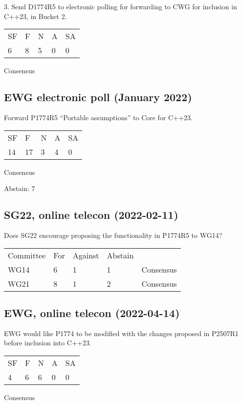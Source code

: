 3. Send D1774R5 to electronic polling for forwarding to CWG for inclusion in C++23, in Bucket 2.

\hspace{6mm}
\begin{tabular}{lllll}
SF & F & N & A & SA \\
6 & 8 & 5 & 0 & 0
\end{tabular}
\hspace{5mm}Consensus

\subsection*{EWG electronic poll (January 2022)}

Forward P1774R5 ``Portable assumptions'' to Core for C++23.

\hspace{6mm}
\begin{tabular}{lllll}
SF & F & N & A & SA \\
14 & 17 & 3 & 4 & 0
\end{tabular}
\hspace{5mm}Consensus

Abstain: 7

\subsection*{SG22, online telecon (2022-02-11)}

Does SG22 encourage proposing the functionality in P1774R5 to WG14?

\hspace{6mm}
\begin{tabular}{lllll}
Committee & For & Against & Abstain &  \\
WG14 & 6 & 1 & 1 & Consensus \\
WG21 & 8 & 1 & 2 & Consensus
\end{tabular}

\subsection*{EWG, online telecon (2022-04-14)}

EWG would like P1774 to be modified with the changes proposed in P2507R1 before inclusion into C++23.

\hspace{6mm}
\begin{tabular}{lllll}
SF & F & N & A & SA \\
4 & 6 & 6 & 0 & 0
\end{tabular}
\hspace{5mm}Consensus


